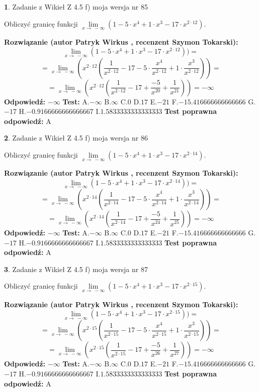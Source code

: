 \documentclass[12pt, a4paper]{article}
\theoremstyle{definition} %
\newtheorem{zad}{}
\newcommand{\zadStart}[1]{\begin{zad}#1\newline}
\newcommand{\zadStop}{\end{zad}}
\newcommand{\rozwStart}[2]{\noindent \textbf{Rozwiązanie (autor #1 , recenzent #2): }\newline}
\newcommand{\rozwStop}{\newline}
\newcommand{\odpStart}{\noindent \textbf{Odpowiedź:}\newline}
\newcommand{\odpStop}{\newline}
\newcommand{\testStart}{\noindent \textbf{Test:}\newline}
\newcommand{\testStop}{\newline}
\newcommand{\kluczStart}{\noindent \textbf{Test poprawna odpowiedź:}\newline}
\newcommand{\kluczStop}{\newline}
\begin{document}
\zadStart{Zadanie z Wikieł Z 4.5 f) moja wersja nr 85}


Obliczyć granicę funkcji  $\lim\limits_{x\to\ -\infty}(1 - 5 \cdot x^{4}+1 \cdot x^{3}- 17 \cdot x^{2\cdot12})$.
\zadStop
\rozwStart{Patryk Wirkus}{Szymon Tokarski}
$$\lim\limits_{x\to\ -\infty}(1 - 5 \cdot x^{4}+1 \cdot x^{3}- 17 \cdot x^{2\cdot12}))=$$
$$=\lim\limits_{x\to\ -\infty}(x^{2\cdot12}(\frac{1}{x^{2\cdot12}}-17 -5 \cdot \frac{x^{4}}{x^{2\cdot12}}+1 \cdot \frac{x^{3}}{x^{2\cdot12}}))=$$
$$=\lim\limits_{x\to\ -\infty}(x^{2\cdot12}(\frac{1}{x^{2\cdot12}}-17 + \frac{-5}{x^{20}}+ \frac{1}{x^{21}}))=-\infty$$
\rozwStop
\odpStart
$-\infty$
\odpStop
\testStart
A.$-\infty$ B.$\infty$ C.$0$ D.$17$ E.$-21$
F.$-15.416666666666666$ G.$-17$
H.$-0.9166666666666667$
I.$1.5833333333333333$
\testStop
\kluczStart
A
\kluczStop



\zadStart{Zadanie z Wikieł Z 4.5 f) moja wersja nr 86}


Obliczyć granicę funkcji  $\lim\limits_{x\to\ -\infty}(1 - 5 \cdot x^{4}+1 \cdot x^{3}- 17 \cdot x^{2\cdot14})$.
\zadStop
\rozwStart{Patryk Wirkus}{Szymon Tokarski}
$$\lim\limits_{x\to\ -\infty}(1 - 5 \cdot x^{4}+1 \cdot x^{3}- 17 \cdot x^{2\cdot14}))=$$
$$=\lim\limits_{x\to\ -\infty}(x^{2\cdot14}(\frac{1}{x^{2\cdot14}}-17 -5 \cdot \frac{x^{4}}{x^{2\cdot14}}+1 \cdot \frac{x^{3}}{x^{2\cdot14}}))=$$
$$=\lim\limits_{x\to\ -\infty}(x^{2\cdot14}(\frac{1}{x^{2\cdot14}}-17 + \frac{-5}{x^{24}}+ \frac{1}{x^{25}}))=-\infty$$
\rozwStop
\odpStart
$-\infty$
\odpStop
\testStart
A.$-\infty$ B.$\infty$ C.$0$ D.$17$ E.$-21$
F.$-15.416666666666666$ G.$-17$
H.$-0.9166666666666667$
I.$1.5833333333333333$
\testStop
\kluczStart
A
\kluczStop



\zadStart{Zadanie z Wikieł Z 4.5 f) moja wersja nr 87}


Obliczyć granicę funkcji  $\lim\limits_{x\to\ -\infty}(1 - 5 \cdot x^{4}+1 \cdot x^{3}- 17 \cdot x^{2\cdot15})$.
\zadStop
\rozwStart{Patryk Wirkus}{Szymon Tokarski}
$$\lim\limits_{x\to\ -\infty}(1 - 5 \cdot x^{4}+1 \cdot x^{3}- 17 \cdot x^{2\cdot15}))=$$
$$=\lim\limits_{x\to\ -\infty}(x^{2\cdot15}(\frac{1}{x^{2\cdot15}}-17 -5 \cdot \frac{x^{4}}{x^{2\cdot15}}+1 \cdot \frac{x^{3}}{x^{2\cdot15}}))=$$
$$=\lim\limits_{x\to\ -\infty}(x^{2\cdot15}(\frac{1}{x^{2\cdot15}}-17 + \frac{-5}{x^{26}}+ \frac{1}{x^{27}}))=-\infty$$
\rozwStop
\odpStart
$-\infty$
\odpStop
\testStart
A.$-\infty$ B.$\infty$ C.$0$ D.$17$ E.$-21$
F.$-15.416666666666666$ G.$-17$
H.$-0.9166666666666667$
I.$1.5833333333333333$
\testStop
\kluczStart
A
\kluczStop
\end{document}
